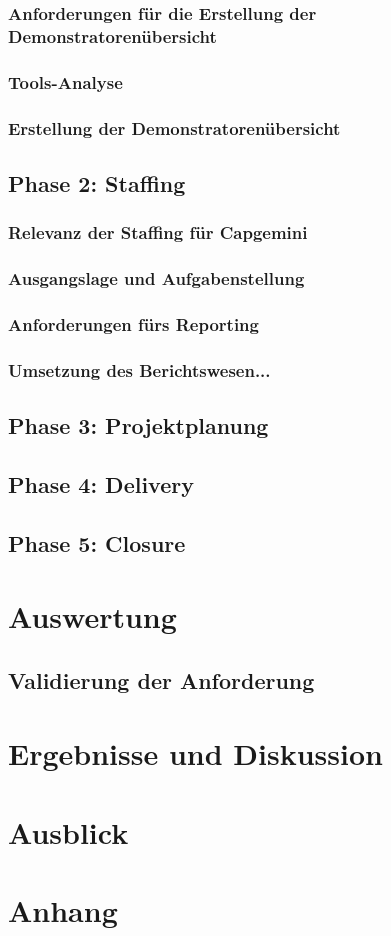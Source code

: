 \documentclass[a4paper, 12pt]{scrartcl}
\begin{document}
	\subsubsection{Anforderungen für die Erstellung der Demonstratorenübersicht} %
	\subsubsection{Tools-Analyse}%
	\subsubsection{Erstellung der Demonstratorenübersicht}
	\newpage
	\subsection{Phase 2: Staffing}
	\subsubsection{Relevanz der Staffing für Capgemini}%
	\subsubsection{Ausgangslage und Aufgabenstellung}
	\subsubsection{Anforderungen fürs Reporting}
	\subsubsection{Umsetzung des Berichtswesen...}
	\newpage
	\subsection{Phase 3: Projektplanung}
	\newpage
	\subsection{Phase 4: Delivery}
	\newpage
	\subsection{Phase 5: Closure}
	\newpage
	\section{Auswertung}
	\subsection{Validierung der Anforderung}%
	\newpage
	\section{Ergebnisse und Diskussion}
	\newpage
	\section{Ausblick}
	
	\newpage
	\section{Anhang}
	
	
\end{document}
